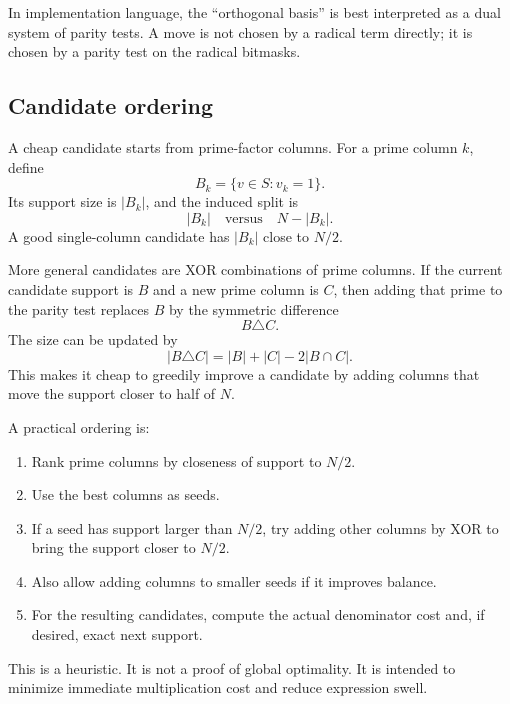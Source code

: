 \documentclass[11pt]{article}
\begin{document}
In implementation language, the ``orthogonal basis'' is best interpreted as a dual system of parity tests. A move is not chosen by a radical term directly; it is chosen by a parity test on the radical bitmasks.

\subsection{Candidate ordering}

A cheap candidate starts from prime-factor columns. For a prime column \(k\), define
\begin{equation}
  B_k=\{v\in S:v_k=1\}.
\end{equation}
Its support size is \(|B_k|\), and the induced split is
\begin{equation}
  |B_k| \quad\text{versus}\quad N-|B_k|.
\end{equation}
A good single-column candidate has \(|B_k|\) close to \(N/2\).

More general candidates are XOR combinations of prime columns. If the current candidate support is \(B\) and a new prime column is \(C\), then adding that prime to the parity test replaces \(B\) by the symmetric difference
\begin{equation}
  B\triangle C.
\end{equation}
The size can be updated by
\begin{equation}
  |B\triangle C|=|B|+|C|-2|B\cap C|.
\end{equation}
This makes it cheap to greedily improve a candidate by adding columns that move the support closer to half of \(N\).

A practical ordering is:
\begin{enumerate}[label=\arabic*.]
  \item Rank prime columns by closeness of support to \(N/2\).
  \item Use the best columns as seeds.
  \item If a seed has support larger than \(N/2\), try adding other columns by XOR to bring the support closer to \(N/2\).
  \item Also allow adding columns to smaller seeds if it improves balance.
  \item For the resulting candidates, compute the actual denominator cost and, if desired, exact next support.
\end{enumerate}

This is a heuristic. It is not a proof of global optimality. It is intended to minimize immediate multiplication cost and reduce expression swell.
\end{document}
